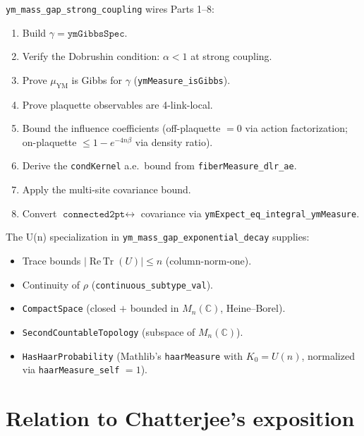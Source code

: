 \documentclass[11pt,a4paper]{article}
\theoremstyle{definition}
\newcommand{\ReTr}{\operatorname{Re\,Tr}}
\begin{document}
\texttt{ym\_mass\_gap\_strong\_coupling} wires Parts 1--8:
\begin{enumerate}
\item Build $\gamma = \texttt{ymGibbsSpec}$.
\item Verify the Dobrushin condition: $\alpha < 1$ at strong coupling.
\item Prove $\mu_\mathrm{YM}$ is Gibbs for $\gamma$
  (\texttt{ymMeasure\_isGibbs}).
\item Prove plaquette observables are 4-link-local.
\item Bound the influence coefficients (off-plaquette $= 0$ via action
  factorization; on-plaquette $\leq 1 - e^{-4n\beta}$ via density
  ratio).
\item Derive the \texttt{condKernel} a.e.\ bound from
  \texttt{fiberMeasure\_dlr\_ae}.
\item Apply the multi-site covariance bound.
\item Convert $\texttt{connected2pt} \leftrightarrow$ covariance via
  \texttt{ymExpect\_eq\_integral\_ymMeasure}.
\end{enumerate}

The U(n) specialization in \texttt{ym\_mass\_gap\_exponential\_decay}
supplies:
\begin{itemize}
\item Trace bounds $|\ReTr(U)| \leq n$ (column-norm-one).
\item Continuity of $\rho$ (\texttt{continuous\_subtype\_val}).
\item \texttt{CompactSpace} (closed $+$ bounded in
  $M_n(\mathbb{C})$, Heine--Borel).
\item \texttt{SecondCountableTopology} (subspace of $M_n(\mathbb{C})$).
\item \texttt{HasHaarProbability} (Mathlib's \texttt{haarMeasure}
  with $K_0 = U(n)$, normalized via \texttt{haarMeasure\_self} $= 1$).
\end{itemize}

\section{Relation to Chatterjee's exposition}
\end{document}

